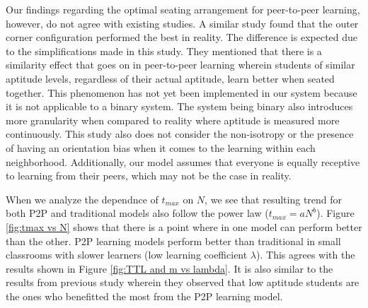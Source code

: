 \documentclass[10pt,a4paper,twoside]{article}
\begin{document}
\noindent Our findings regarding the optimal seating arrangement for peer-to-peer learning, however, do not agree with existing studies. A similar study \cite{roxas2010seating}found that the outer corner configuration performed the best in reality. The difference is expected due to the simplifications made in this study. They mentioned that there is a similarity effect that goes on in peer-to-peer learning wherein students of similar aptitude levels, regardless of their actual aptitude, learn better when seated together. This phenomenon has not yet been implemented in our system because it is not applicable to a binary system. The system being binary also introduces more granularity when compared to reality where aptitude is measured more continuously. This study also does not consider the non-isotropy or the presence of having an orientation bias when it comes to the learning within each neighborhood. Additionally, our model assumes that everyone is equally receptive to learning from their peers, which may not be the case in reality.

\noindent When we analyze the dependnce of $t_{max}$ on $N$, we see that resulting trend for both P2P and traditional models also follow the power law ($t_{max}=aN^b$). Figure \ref{fig:tmax vs N} shows that there is a point where in one model can perform better than the other. P2P learning models perform better than traditional in small classrooms with slower learners (low learning coefficient $\lambda$). This agrees with the results shown in Figure \ref{fig:TTL and m vs lambda}. It is also similar to the results from previous study \cite{roxas2010seating} wherein they observed that low aptitude students are the ones who benefitted the most from the P2P learning model.
\end{document}

